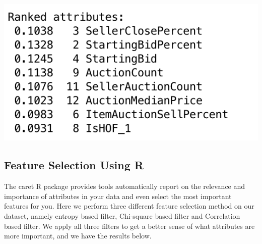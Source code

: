 \documentclass[CEJM,PDF]{cej} %
\begin{document}
{\centering
    \vspace{3 mm}
    \includegraphics[scale=0.6]{weka-FilteredSubsetWithGreedyStepwise.png}
    \par
}

\subsection{Feature Selection Using R}
The caret R package provides tools automatically report on the relevance and importance of attributes in your data and even select the most important features for you. Here we perform three different feature selection method on our dataset, namely entropy based filter, Chi-square based filter and Correlation based filter. We apply all three filters to get a better sense of what attributes are more important, and we have the results below.
\end{document}
